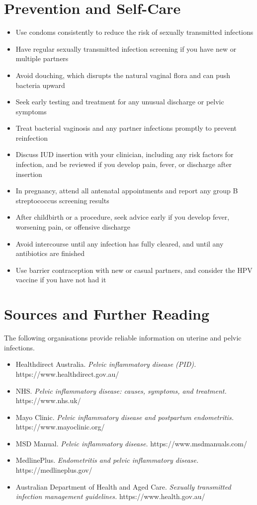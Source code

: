 \section*{Prevention and Self-Care}
\begin{itemize}
    \item Use condoms consistently to reduce the risk of sexually transmitted infections
    \item Have regular sexually transmitted infection screening if you have new or multiple partners
    \item Avoid douching, which disrupts the natural vaginal flora and can push bacteria upward
    \item Seek early testing and treatment for any unusual discharge or pelvic symptoms
    \item Treat bacterial vaginosis and any partner infections promptly to prevent reinfection
    \item Discuss IUD insertion with your clinician, including any risk factors for infection, and be reviewed if you develop pain, fever, or discharge after insertion
    \item In pregnancy, attend all antenatal appointments and report any group B streptococcus screening results
    \item After childbirth or a procedure, seek advice early if you develop fever, worsening pain, or offensive discharge
    \item Avoid intercourse until any infection has fully cleared, and until any antibiotics are finished
    \item Use barrier contraception with new or casual partners, and consider the HPV vaccine if you have not had it
\end{itemize}

\section*{Sources and Further Reading}
The following organisations provide reliable information on uterine and pelvic infections.

\begin{itemize}
    \item Healthdirect Australia. \textit{Pelvic inflammatory disease (PID).} https://www.healthdirect.gov.au/
    \item NHS. \textit{Pelvic inflammatory disease: causes, symptoms, and treatment.} https://www.nhs.uk/
    \item Mayo Clinic. \textit{Pelvic inflammatory disease and postpartum endometritis.} https://www.mayoclinic.org/
    \item MSD Manual. \textit{Pelvic inflammatory disease.} https://www.msdmanuals.com/
    \item MedlinePlus. \textit{Endometritis and pelvic inflammatory disease.} https://medlineplus.gov/
    \item Australian Department of Health and Aged Care. \textit{Sexually transmitted infection management guidelines.} https://www.health.gov.au/
\end{itemize}
